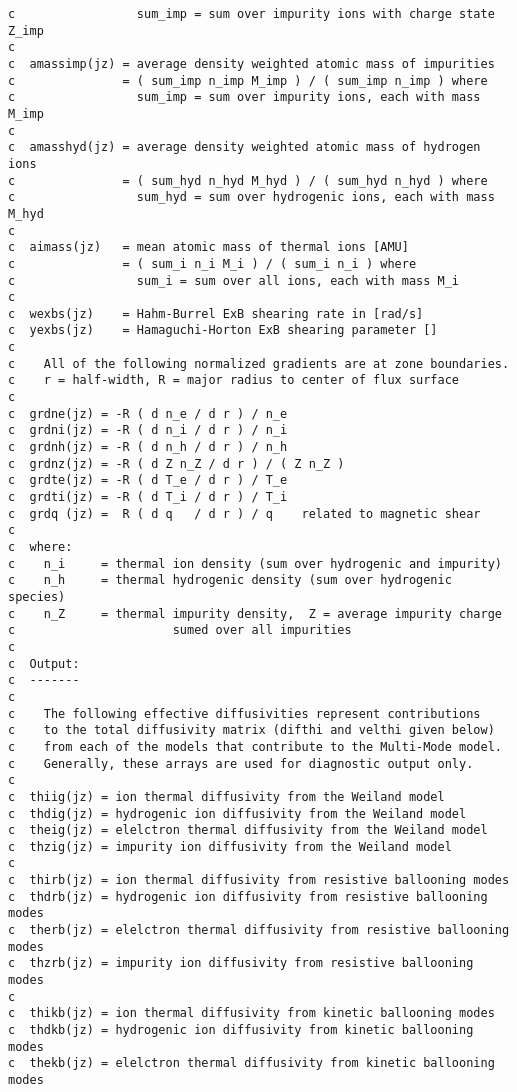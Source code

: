 \begin{verbatim}
c                 sum_imp = sum over impurity ions with charge state Z_imp
c
c  amassimp(jz) = average density weighted atomic mass of impurities
c               = ( sum_imp n_imp M_imp ) / ( sum_imp n_imp ) where
c                 sum_imp = sum over impurity ions, each with mass M_imp
c
c  amasshyd(jz) = average density weighted atomic mass of hydrogen ions
c               = ( sum_hyd n_hyd M_hyd ) / ( sum_hyd n_hyd ) where
c                 sum_hyd = sum over hydrogenic ions, each with mass M_hyd
c
c  aimass(jz)   = mean atomic mass of thermal ions [AMU]
c               = ( sum_i n_i M_i ) / ( sum_i n_i ) where
c                 sum_i = sum over all ions, each with mass M_i
c
c  wexbs(jz)    = Hahm-Burrel ExB shearing rate in [rad/s]
c  yexbs(jz)    = Hamaguchi-Horton ExB shearing parameter []
c
c    All of the following normalized gradients are at zone boundaries.
c    r = half-width, R = major radius to center of flux surface
c
c  grdne(jz) = -R ( d n_e / d r ) / n_e
c  grdni(jz) = -R ( d n_i / d r ) / n_i
c  grdnh(jz) = -R ( d n_h / d r ) / n_h
c  grdnz(jz) = -R ( d Z n_Z / d r ) / ( Z n_Z )
c  grdte(jz) = -R ( d T_e / d r ) / T_e
c  grdti(jz) = -R ( d T_i / d r ) / T_i
c  grdq (jz) =  R ( d q   / d r ) / q    related to magnetic shear
c
c  where:
c    n_i     = thermal ion density (sum over hydrogenic and impurity)
c    n_h     = thermal hydrogenic density (sum over hydrogenic species)
c    n_Z     = thermal impurity density,  Z = average impurity charge
c                      sumed over all impurities
c
c  Output:
c  -------
c
c    The following effective diffusivities represent contributions
c    to the total diffusivity matrix (difthi and velthi given below)
c    from each of the models that contribute to the Multi-Mode model.
c    Generally, these arrays are used for diagnostic output only.
c
c  thiig(jz) = ion thermal diffusivity from the Weiland model
c  thdig(jz) = hydrogenic ion diffusivity from the Weiland model
c  theig(jz) = elelctron thermal diffusivity from the Weiland model
c  thzig(jz) = impurity ion diffusivity from the Weiland model
c
c  thirb(jz) = ion thermal diffusivity from resistive ballooning modes
c  thdrb(jz) = hydrogenic ion diffusivity from resistive ballooning modes
c  therb(jz) = elelctron thermal diffusivity from resistive ballooning modes
c  thzrb(jz) = impurity ion diffusivity from resistive ballooning modes
c
c  thikb(jz) = ion thermal diffusivity from kinetic ballooning modes
c  thdkb(jz) = hydrogenic ion diffusivity from kinetic ballooning modes
c  thekb(jz) = elelctron thermal diffusivity from kinetic ballooning modes

\end{verbatim}
